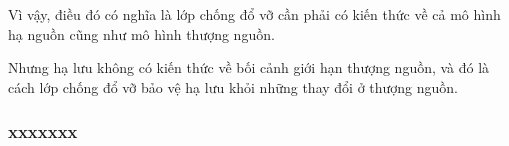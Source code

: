 \documentclass{article} %
\begin{document}
Vì vậy, điều đó có nghĩa là lớp chống đổ vỡ cần phải có kiến thức về cả mô hình hạ nguồn cũng như mô hình thượng nguồn.

Nhưng hạ lưu không có kiến thức về bối cảnh giới hạn thượng nguồn, và đó là cách lớp chống đổ vỡ bảo vệ hạ lưu khỏi những thay đổi ở thượng nguồn.

%
%


\subsubsection{xxxxxxx}
% 
\end{document}
